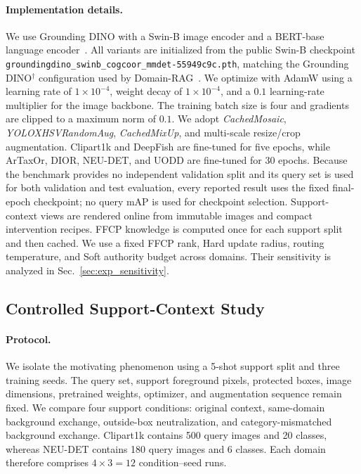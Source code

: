 \paragraph{Implementation details.}
We use Grounding DINO with a Swin-B image encoder and a BERT-base language encoder~\cite{groundingdino}. All variants are initialized from the public Swin-B checkpoint
\texttt{groundingdino\_swinb\allowbreak\_cogcoor\allowbreak\_mmdet-55949c9c.pth},
matching the Grounding DINO$^\dagger$ configuration used by Domain-RAG~\cite{domainrag}. We optimize with AdamW using a learning rate of $1\times10^{-4}$, weight decay of $1\times10^{-4}$, and a $0.1$ learning-rate multiplier for the image backbone. The training batch size is four and gradients are clipped to a maximum norm of $0.1$. We adopt \emph{CachedMosaic}, \emph{YOLOXHSVRandomAug}, \emph{CachedMixUp}, and multi-scale resize/crop augmentation. Clipart1k and DeepFish are fine-tuned for five epochs, while ArTaxOr, DIOR, NEU-DET, and UODD are fine-tuned for 30 epochs. Because the benchmark provides no independent validation split and its query set is used for both validation and test evaluation, every reported result uses the fixed final-epoch checkpoint; no query mAP is used for checkpoint selection. Support-context views are rendered online from immutable images and compact intervention recipes. FFCP knowledge is computed once for each support split and then cached. We use a fixed FFCP rank, Hard update radius, routing temperature, and Soft authority budget across domains. Their sensitivity is analyzed in Sec.~\ref{sec:exp_sensitivity}.

\subsection{Controlled Support-Context Study}
\label{sec:controlled_pilot}

\paragraph{Protocol.}
We isolate the motivating phenomenon using a 5-shot support split and three training seeds. The query set, support foreground pixels, protected boxes, image dimensions, pretrained weights, optimizer, and augmentation sequence remain fixed. We compare four support conditions: original context, same-domain background exchange, outside-box neutralization, and category-mismatched background exchange. Clipart1k contains 500 query images and 20 classes, whereas NEU-DET contains 180 query images and 6 classes. Each domain therefore comprises $4\times3=12$ condition--seed runs.

